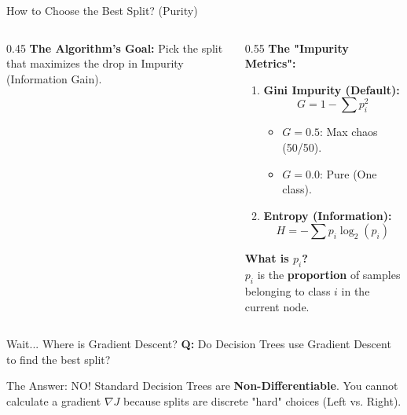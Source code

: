 \begin{frame}{How to Choose the Best Split? (Purity)}
\begin{columns}[T]
\begin{column}{0.45\textwidth}
            \vspace{1em}
    \centering
    \small \textbf{The Algorithm's Goal:} Pick the split that maximizes the drop in Impurity (Information Gain).
    
        \end{column}
        
        \begin{column}{0.55\textwidth}
            \textbf{The "Impurity Metrics":}
            \small
            \begin{enumerate}
                \item \textbf{Gini Impurity (Default):}
                $$ G = 1 - \sum p_i^2 $$
                \vspace{-3mm}
                \small
                \begin{itemize}
                    \item $G=0.5$: Max chaos (50/50).
                    \item $G=0.0$: Pure (One class).
                \end{itemize}
                \item \textbf{Entropy (Information):}
                $$ H = - \sum p_i \log_2(p_i) $$
            \end{enumerate}
            
            \begin{tcolorbox}[colback=yellow!10, colframe=orange!40, boxsep=2pt, left=2pt, right=2pt, top=2pt, bottom=2pt]
                \centering
                \textbf{What is $p_i$?} \\
                $p_i$ is the \textbf{proportion} of samples belonging to class $i$ in the current node.
            \end{tcolorbox}
        \end{column}
    \end{columns}
\end{frame}
\begin{frame}{Wait... Where is Gradient Descent?}
    \textbf{Q:} Do Decision Trees use Gradient Descent to find the best split?
    \pause
    
    \begin{alertblock}{The Answer: NO!}
        Standard Decision Trees are \textbf{Non-Differentiable}.
        You cannot calculate a gradient $\nabla J$ because splits are discrete "hard" choices (Left vs. Right).
    \end{alertblock}
    
\end{frame}

